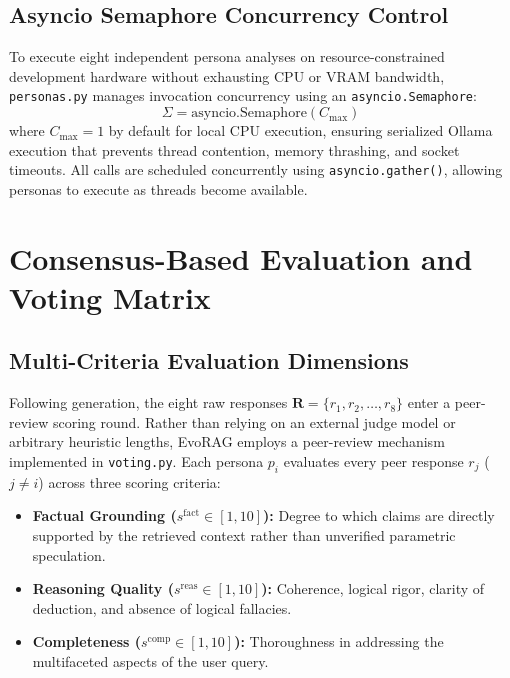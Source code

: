 \subsection{Asyncio Semaphore Concurrency Control}
To execute eight independent persona analyses on resource-constrained development hardware without exhausting CPU or VRAM bandwidth, \texttt{personas.py} manages invocation concurrency using an \texttt{asyncio.Semaphore}:
\begin{equation}
\Sigma = \text{asyncio.Semaphore}(C_{\text{max}})
\end{equation}
where $C_{\text{max}} = 1$ by default for local CPU execution, ensuring serialized Ollama execution that prevents thread contention, memory thrashing, and socket timeouts. All calls are scheduled concurrently using \texttt{asyncio.gather()}, allowing personas to execute as threads become available.

\section{Consensus-Based Evaluation and Voting Matrix}
\label{sec:consensus_voting}

\subsection{Multi-Criteria Evaluation Dimensions}
Following generation, the eight raw responses $\mathbf{R} = \{r_1, r_2, \dots, r_8\}$ enter a peer-review scoring round. Rather than relying on an external judge model or arbitrary heuristic lengths, EvoRAG employs a peer-review mechanism implemented in \texttt{voting.py}. Each persona $p_i$ evaluates every peer response $r_j$ ($j \neq i$) across three scoring criteria:
\begin{itemize}
    \item \textbf{Factual Grounding ($s^{\text{fact}} \in [1, 10]$):} Degree to which claims are directly supported by the retrieved context rather than unverified parametric speculation.
    \item \textbf{Reasoning Quality ($s^{\text{reas}} \in [1, 10]$):} Coherence, logical rigor, clarity of deduction, and absence of logical fallacies.
    \item \textbf{Completeness ($s^{\text{comp}} \in [1, 10]$):} Thoroughness in addressing the multifaceted aspects of the user query.
\end{itemize}

